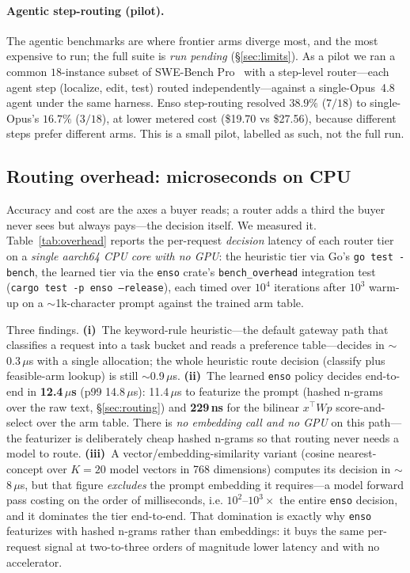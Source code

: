 \documentclass[11pt]{article}
\begin{document}
\paragraph{Agentic step-routing (pilot).} The agentic benchmarks are where frontier
arms diverge most, and the most expensive to run; the full suite is
\emph{run pending} (\S\ref{sec:limits}). As a pilot we ran a common $18$-instance
subset of SWE-Bench Pro~\cite{swebench} with a step-level router---each agent step
(localize, edit, test) routed independently---against a single-Opus~4.8 agent under
the same harness. Enso step-routing resolved $38.9\%$ ($7/18$) to single-Opus's
$16.7\%$ ($3/18$), at lower metered cost (\$19.70 vs \$27.56), because different
steps prefer different arms. This is a small pilot, labelled as such, not the full
run.

\subsection{Routing overhead: microseconds on CPU}
\label{sec:overhead}

Accuracy and cost are the axes a buyer reads; a router adds a third the buyer
never sees but always pays---the decision itself. We measured it. Table~\ref{tab:overhead}
reports the per-request \emph{decision} latency of each router tier on a
\emph{single aarch64 CPU core with no GPU}: the heuristic tier via Go's
\texttt{go test -bench}, the learned tier via the \texttt{enso} crate's
\texttt{bench\_overhead} integration test (\texttt{cargo test -p enso --release}),
each timed over $10^{4}$ iterations after $10^{3}$ warm-up on a $\sim$1k-character
prompt against the trained arm table.

Three findings. \textbf{(i)}~The keyword-rule heuristic---the default gateway path
that classifies a request into a task bucket and reads a preference table---decides
in $\sim$0.3\,$\mu$s with a single allocation; the whole heuristic route decision
(classify plus feasible-arm lookup) is still $\sim$0.9\,$\mu$s. \textbf{(ii)}~The
learned \texttt{enso} policy decides end-to-end in \textbf{12.4\,$\mu$s}
(p99 14.8\,$\mu$s): 11.4\,$\mu$s to featurize the prompt (hashed n-grams over the
raw text, \S\ref{sec:routing}) and \textbf{229\,ns} for the bilinear $x^{\top}Wp$
score-and-select over the arm table. There is \emph{no embedding call and no GPU}
on this path---the featurizer is deliberately cheap hashed n-grams so that routing
never needs a model to route. \textbf{(iii)}~A vector/embedding-similarity variant
(cosine nearest-concept over $K{=}20$ model vectors in 768 dimensions) computes its
decision in $\sim$8\,$\mu$s, but that figure \emph{excludes} the prompt embedding it
requires---a model forward pass costing on the order of milliseconds, i.e.
$10^{2}$--$10^{3}\times$ the entire \texttt{enso} decision, and it dominates the
tier end-to-end. That domination is exactly why \texttt{enso} featurizes with hashed
n-grams rather than embeddings: it buys the same per-request signal at
two-to-three orders of magnitude lower latency and with no accelerator.
\end{document}
